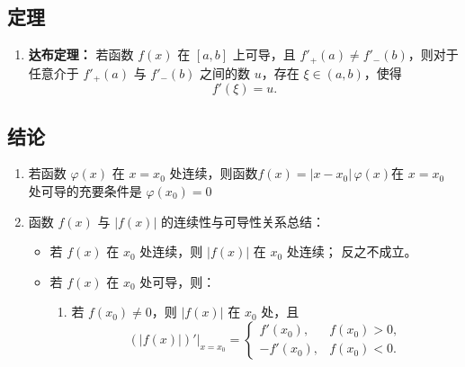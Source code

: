 \documentclass[a4paper,12pt]{article}
\begin{document}
    \subsection{定理}

    \begin{enumerate}
        \item \textbf{达布定理：} 若函数 $f(x)$ 在 $[a,b]$ 上可导，且 $f'_+(a)\neq f'_-(b)$，则对于任意介于 $f'_+(a)$ 与 $f'_-(b)$ 之间的数 $u$，存在 $\xi\in(a,b)$，使得
        \[
            f'(\xi)=u.
        \]
    \end{enumerate}

    \subsection{结论}

    \begin{enumerate}
        \item 若函数 $\varphi(x)$ 在 $x=x_0$ 处连续，则函数$f(x)=|x-x_0|\,\varphi(x)$在 $x=x_0$ 处可导的充要条件是 $\varphi(x_0)=0$
        \item 函数 $f(x)$ 与 $|f(x)|$ 的连续性与可导性关系总结：
        \begin{itemize}
            \item 若 $f(x)$ 在 $x_0$ 处连续，则 $|f(x)|$ 在 $x_0$ 处连续； 反之不成立。
            \item 若 $f(x)$ 在 $x_0$ 处可导，则：
            \begin{enumerate}[label=(\alph*)]
                \item 若 $f(x_0) \neq 0$，则 $|f(x)|$ 在 $x_0$ 处{\color{red}{可导}}，且
                \[
                    \left.(|f(x)|)'\right|_{x=x_0}
                    =
                    \begin{cases}
                        f'(x_0), & f(x_0) > 0, \\[0.3em]
                        -f'(x_0), & f(x_0) < 0.
                    \end{cases}
                \]


\end{enumerate}
\end{itemize}
\end{enumerate}
\end{document}
